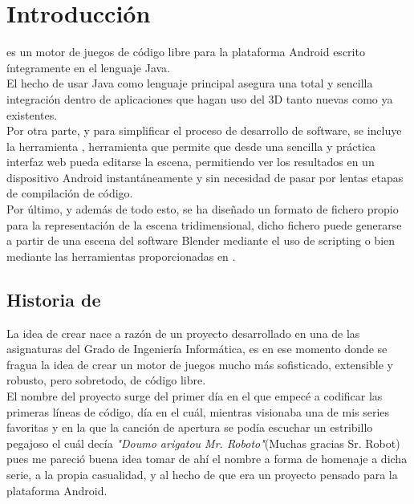 
\chapter{Introducci\'on} %

\label{Chapter1} %



\robotto es un motor de juegos de código libre para la plataforma Android escrito íntegramente en el lenguaje Java.\\
El hecho de usar Java como lenguaje principal asegura una total y sencilla integración dentro de aplicaciones que hagan uso del 3D tanto nuevas como ya existentes.\\
Por otra parte, y para simplificar el proceso de desarrollo de software, se incluye la herramienta \studio, herramienta que permite que desde una sencilla y práctica interfaz web pueda editarse la escena, permitiendo ver los resultados en un dispositivo Android instantáneamente y sin necesidad de pasar por lentas etapas de compilación de código.\\
Por último, y además de todo esto, se ha diseñado un formato de fichero propio para la representación de la escena tridimensional, dicho fichero puede generarse a partir de una escena del software Blender mediante el uso de scripting o bien mediante las herramientas proporcionadas en \studio.\\


\section{Historia de \robotto}
La idea de crear \robotto nace a razón de un proyecto desarrollado en una de las asignaturas del Grado de Ingeniería Informática, es en ese momento donde se fragua la idea de crear un motor de juegos mucho más sofisticado, extensible y robusto, pero sobretodo, de código libre.\\
El nombre del proyecto surge del primer día en el que empecé a codificar las primeras líneas de código, día en el cuál, mientras visionaba una de mis series favoritas y en la que la canción de apertura se podía escuchar un estribillo pegajoso el cuál decía \textit{"Doumo arigatou Mr. Roboto"}(Muchas gracias Sr. Robot) pues me pareció buena idea tomar de ahí el nombre a forma de homenaje a dicha serie, a la propia casualidad, y al hecho de que era un proyecto pensado para la plataforma Android.

